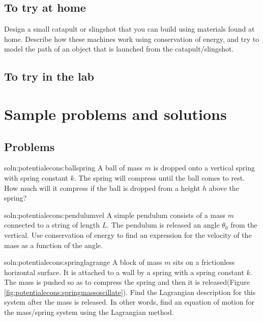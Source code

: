 \subsection{To try at home}
\begin{tQuestion}Design a small catapult or slingshot that you can build using materials found at home. Describe how these machines work using conservation of energy, and try to model the path of an object that is launched from the catapult/slingshot.\end{tQuestion}

\subsection{To try in the lab}

\newpage
\section{Sample problems and solutions}
\subsection{Problems}

\begin{problem}{soln:potentialecons:ballspring}{\label{prob:potentialecons:ballspring} A ball of mass $m$ is dropped onto a vertical spring with spring constant $k$. The spring will compress until the ball comes to rest. How much will it compress if the ball is dropped from a height $h$ above the spring?}
\end{problem}


\begin{problem}{soln:potentialecons:pendulumvel}{\label{prob:potentialecons:pendulumvel}
A simple pendulum consists of a mass $m$ connected to a string of length $L$. The pendulum is released an angle $\theta_0$ from the vertical. Use conservation of energy to find an expression for the velocity of the mass as a function of the angle.}
\end{problem}


\begin{problem}{soln:potentialecons:springlagrange}{ \label{prob:potentialecons:springlagrange} A block of mass $m$ sits on a frictionless horizontal surface. It is attached to a wall by a spring with a spring constant $k$. The mass is pushed so as to compress the spring and then it is released(Figure \ref{fig:potentialecons:springmassoscillate}). Find the Lagrangian description for this system after the mass is released. In other words, find an equation of motion for the mass/spring system using the Lagrangian method.}
\end{problem} 



